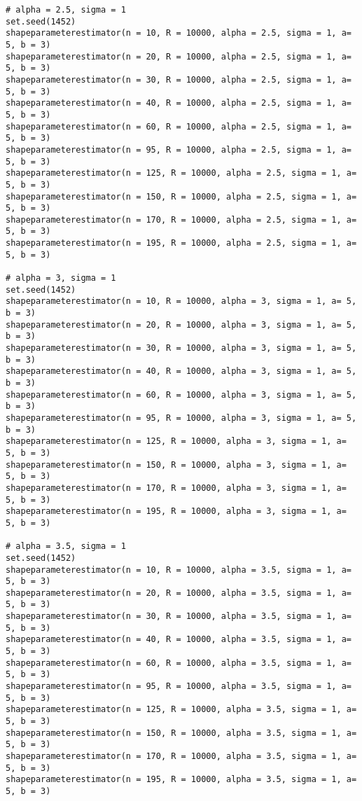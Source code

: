\documentclass[a4paper,12pt]{report}
\begin{document}
{\begin{verbatim}
# alpha = 2.5, sigma = 1
set.seed(1452)
shapeparameterestimator(n = 10, R = 10000, alpha = 2.5, sigma = 1, a= 5, b = 3)
shapeparameterestimator(n = 20, R = 10000, alpha = 2.5, sigma = 1, a= 5, b = 3)
shapeparameterestimator(n = 30, R = 10000, alpha = 2.5, sigma = 1, a= 5, b = 3)
shapeparameterestimator(n = 40, R = 10000, alpha = 2.5, sigma = 1, a= 5, b = 3)
shapeparameterestimator(n = 60, R = 10000, alpha = 2.5, sigma = 1, a= 5, b = 3)
shapeparameterestimator(n = 95, R = 10000, alpha = 2.5, sigma = 1, a= 5, b = 3)
shapeparameterestimator(n = 125, R = 10000, alpha = 2.5, sigma = 1, a= 5, b = 3)
shapeparameterestimator(n = 150, R = 10000, alpha = 2.5, sigma = 1, a= 5, b = 3)
shapeparameterestimator(n = 170, R = 10000, alpha = 2.5, sigma = 1, a= 5, b = 3)
shapeparameterestimator(n = 195, R = 10000, alpha = 2.5, sigma = 1, a= 5, b = 3)

# alpha = 3, sigma = 1
set.seed(1452)
shapeparameterestimator(n = 10, R = 10000, alpha = 3, sigma = 1, a= 5, b = 3)
shapeparameterestimator(n = 20, R = 10000, alpha = 3, sigma = 1, a= 5, b = 3)
shapeparameterestimator(n = 30, R = 10000, alpha = 3, sigma = 1, a= 5, b = 3)
shapeparameterestimator(n = 40, R = 10000, alpha = 3, sigma = 1, a= 5, b = 3)
shapeparameterestimator(n = 60, R = 10000, alpha = 3, sigma = 1, a= 5, b = 3)
shapeparameterestimator(n = 95, R = 10000, alpha = 3, sigma = 1, a= 5, b = 3)
shapeparameterestimator(n = 125, R = 10000, alpha = 3, sigma = 1, a= 5, b = 3)
shapeparameterestimator(n = 150, R = 10000, alpha = 3, sigma = 1, a= 5, b = 3)
shapeparameterestimator(n = 170, R = 10000, alpha = 3, sigma = 1, a= 5, b = 3)
shapeparameterestimator(n = 195, R = 10000, alpha = 3, sigma = 1, a= 5, b = 3)

# alpha = 3.5, sigma = 1
set.seed(1452)
shapeparameterestimator(n = 10, R = 10000, alpha = 3.5, sigma = 1, a= 5, b = 3)
shapeparameterestimator(n = 20, R = 10000, alpha = 3.5, sigma = 1, a= 5, b = 3)
shapeparameterestimator(n = 30, R = 10000, alpha = 3.5, sigma = 1, a= 5, b = 3)
shapeparameterestimator(n = 40, R = 10000, alpha = 3.5, sigma = 1, a= 5, b = 3)
shapeparameterestimator(n = 60, R = 10000, alpha = 3.5, sigma = 1, a= 5, b = 3)
shapeparameterestimator(n = 95, R = 10000, alpha = 3.5, sigma = 1, a= 5, b = 3)
shapeparameterestimator(n = 125, R = 10000, alpha = 3.5, sigma = 1, a= 5, b = 3)
shapeparameterestimator(n = 150, R = 10000, alpha = 3.5, sigma = 1, a= 5, b = 3)
shapeparameterestimator(n = 170, R = 10000, alpha = 3.5, sigma = 1, a= 5, b = 3)
shapeparameterestimator(n = 195, R = 10000, alpha = 3.5, sigma = 1, a= 5, b = 3)


\end{verbatim}}
\end{document}
